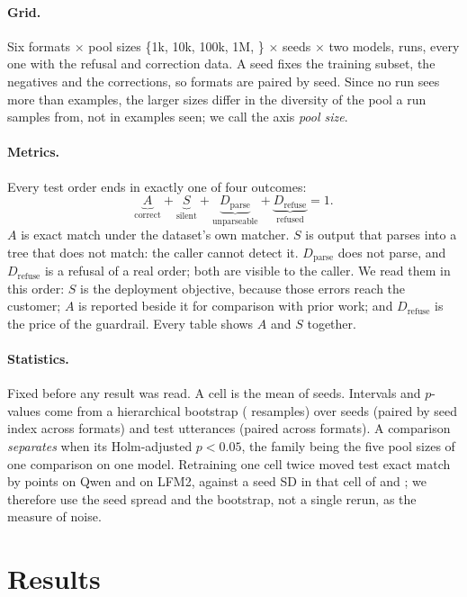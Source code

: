 \documentclass[11pt]{article}
\begin{document}
\paragraph{Grid.}
Six formats $\times$ pool sizes \{1k, 10k, 100k, 1M, \nHead{}\} $\times$
\nSeeds{} seeds $\times$ two models, \nGrid{} runs, every one with the refusal and
correction data. A seed fixes the training subset, the negatives and the
corrections, so formats are paired by seed. Since no run sees more than
\samplesSeen{} examples, the larger sizes differ in the diversity of the pool a
run samples from, not in examples seen; we call the axis \emph{pool size}.

\paragraph{Metrics.}
\label{sec:metrics}
Every test order ends in exactly one of four outcomes:
\[
\underbrace{A}_{\text{correct}} + \underbrace{S}_{\text{silent}}
+ \underbrace{D_\text{parse}}_{\text{unparseable}}
+ \underbrace{D_\text{refuse}}_{\text{refused}} = 1 .
\]
$A$ is exact match under the dataset's own matcher. $S$ is output that parses
into a tree that does not match: the caller cannot detect it. $D_\text{parse}$
does not parse, and $D_\text{refuse}$ is a refusal of a real order; both are
visible to the caller. We read them in this order: $S$ is the deployment
objective, because those errors reach the customer; $A$ is reported beside it for
comparison with prior work; and $D_\text{refuse}$ is the price of the guardrail.
Every table shows $A$ and $S$ together.

\paragraph{Statistics.}
Fixed before any result was read. A cell is the mean of \nSeeds{} seeds. Intervals
and $p$-values come from a hierarchical bootstrap (\nBoot{} resamples) over seeds
(paired by seed index across formats) and test utterances (paired across
formats). A comparison \emph{separates} when its Holm-adjusted $p<0.05$, the
family being the five pool sizes of one comparison on one model. Retraining one
cell twice moved test exact match by \Qrerun{} points on Qwen and \Lrerun{} on
LFM2, against a seed SD in that cell of \QrerunSeedSd{} and \LrerunSeedSd{}; we
therefore use the seed spread and the bootstrap, not a single rerun, as the
measure of noise.

\section{Results}
\label{sec:results}
\end{document}
